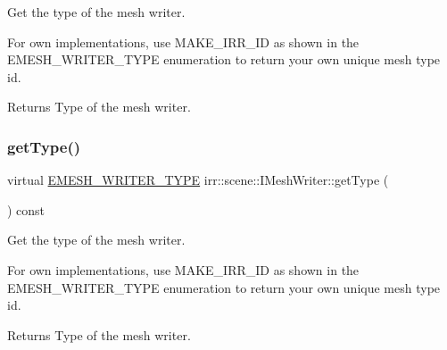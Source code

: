 Get the type of the mesh writer. 

For own implementations, use M\+A\+K\+E\+\_\+\+I\+R\+R\+\_\+\+ID as shown in the E\+M\+E\+S\+H\+\_\+\+W\+R\+I\+T\+E\+R\+\_\+\+T\+Y\+PE enumeration to return your own unique mesh type id. \begin{DoxyReturn}{Returns}
Type of the mesh writer. 
\end{DoxyReturn}
\mbox{\label{classirr_1_1scene_1_1IMeshWriter_af70d702a86e25074f96e93a2d5a15813}} 
\subsubsection{\texorpdfstring{get\+Type()}{getType()}\hspace{0.1cm}{\footnotesize\ttfamily [2/2]}}
{\footnotesize\ttfamily virtual \hyperlink{namespaceirr_1_1scene_a431fa15741518ba15f6d5f2608b6cb4e}{E\+M\+E\+S\+H\+\_\+\+W\+R\+I\+T\+E\+R\+\_\+\+T\+Y\+PE} irr\+::scene\+::\+I\+Mesh\+Writer\+::get\+Type (\begin{DoxyParamCaption}{ }\end{DoxyParamCaption}) const\hspace{0.3cm}{\ttfamily [pure virtual]}}



Get the type of the mesh writer. 

For own implementations, use M\+A\+K\+E\+\_\+\+I\+R\+R\+\_\+\+ID as shown in the E\+M\+E\+S\+H\+\_\+\+W\+R\+I\+T\+E\+R\+\_\+\+T\+Y\+PE enumeration to return your own unique mesh type id. \begin{DoxyReturn}{Returns}
Type of the mesh writer. 
\end{DoxyReturn}
\mbox{\label{classirr_1_1scene_1_1IMeshWriter_a8cc31e211dc94104c7dd4b0ce4fd2cca}} 
